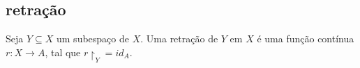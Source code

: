 \subsection{retração}
\label{retração-def}
\begin{defi}[Retração]
Seja $Y \subseteq X$ um subespaço de $X$. Uma retração de $Y$ em $X$ é uma função contínua $r:X \to A$, tal que $r\restriction_Y = id_A$.	 
\end{defi}


